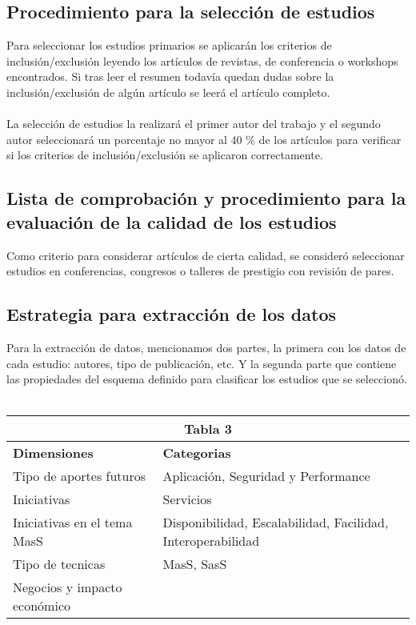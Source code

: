 \documentclass{llncs}
\begin{document}
\subsection{Procedimiento para la selección de estudios}
Para seleccionar los estudios primarios se aplicarán los criterios de inclusión/exclusión leyendo los artículos de revistas, de conferencia o workshops encontrados. Si tras leer el resumen todavía quedan dudas sobre la inclusión/exclusión de algún artículo se leerá el artículo completo.\\ \\
La selección de estudios la realizará el primer autor del trabajo y el segundo autor seleccionará un porcentaje no mayor al 40  \% de los artículos  para verificar si los criterios de inclusión/exclusión se aplicaron correctamente.

\subsection{Lista de comprobación y procedimiento para la evaluación de la calidad de los estudios}
Como criterio para considerar artículos de cierta calidad, se consideró seleccionar estudios en conferencias, congresos o talleres de prestigio con revisión de pares.

\subsection{Estrategia para extracción de los datos}
Para la extracción de datos, mencionamos dos partes, la primera con los datos de cada estudio: autores, tipo de publicación, etc. Y la segunda parte que contiene las propiedades del esquema definido para clasificar los estudios que se seleccionó.\\ \\

\begin{tabular}{  | p{5cm} | p{7cm}  | }
  \hline
  \multicolumn{2}{|c|}{\bf Tabla 3} \\
  \hline
  \bf Dimensiones & \bf Categorias \\
  \hline
   Tipo de aportes futuros &  Aplicación, Seguridad y Performance \\
  \hline
   Iniciativas & Servicios\\
   \hline
   Iniciativas en el tema MasS & Disponibilidad, Escalabilidad, Facilidad, Interoperabilidad \\
   \hline
    Tipo de tecnicas & MasS, SasS\\
   \hline
    Negocios y impacto económico & \\
    \hline
\end{tabular}
\end{document}
